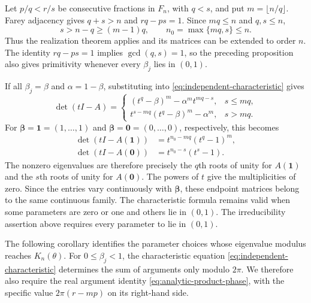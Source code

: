 \documentclass[11pt,a4paper]{article}
\theoremstyle{definition}
\theoremstyle{remark}
\numberwithin{equation}{section}
\begin{document}
Let $p/q<r/s$ be consecutive fractions in $F_n$, with $q<s$, and put $m=\lfloor n/q\rfloor$. Farey adjacency gives $q+s>n$ and $rq-ps=1$. Since $mq\le n$ and $q,s\le n$,
\[
 s>n-q\ge(m-1)q,\qquad n_0=\max\{mq,s\}\le n.
\]
Thus the realization theorem applies and its matrices can be extended to order $n$. The identity $rq-ps=1$ implies $\gcd(q,s)=1$, so the preceding proposition also gives primitivity whenever every $\beta_j$ lies in $(0,1)$.

If all $\beta_j=\beta$ and $\alpha=1-\beta$, substituting into \eqref{eq:independent-characteristic} gives
\[
 \det(tI-A)=
 \begin{cases}
 (t^q-\beta)^m-\alpha^m t^{mq-s},&s\le mq,\\
 t^{s-mq}(t^q-\beta)^m-\alpha^m,&s>mq.
 \end{cases}
\]
For $\boldsymbol\beta=\mathbf1=(1,\ldots,1)$ and $\boldsymbol\beta=\mathbf0=(0,\ldots,0)$, respectively, this becomes
\[
 \begin{aligned}
 \det(tI-A(\mathbf1))&=t^{n_0-mq}(t^q-1)^m,\\
 \det(tI-A(\mathbf0))&=t^{n_0-s}(t^s-1).
 \end{aligned}
\]
The nonzero eigenvalues are therefore precisely the $q$th roots of unity for $A(\mathbf1)$ and the $s$th roots of unity for $A(\mathbf0)$. The powers of $t$ give the multiplicities of zero. Since the entries vary continuously with $\boldsymbol\beta$, these endpoint matrices belong to the same continuous family. The characteristic formula remains valid when some parameters are zero or one and others lie in $(0,1)$. The irreducibility assertion above requires every parameter to lie in $(0,1)$.

The following corollary identifies the parameter choices whose eigenvalue modulus reaches $K_n(\theta)$. For $0\le\beta_j<1$, the characteristic equation \eqref{eq:independent-characteristic} determines the sum of arguments only modulo $2\pi$. We therefore also require the real argument identity \eqref{eq:analytic-product-phase}, with the specific value $2\pi(r-mp)$ on its right-hand side.
\end{document}
